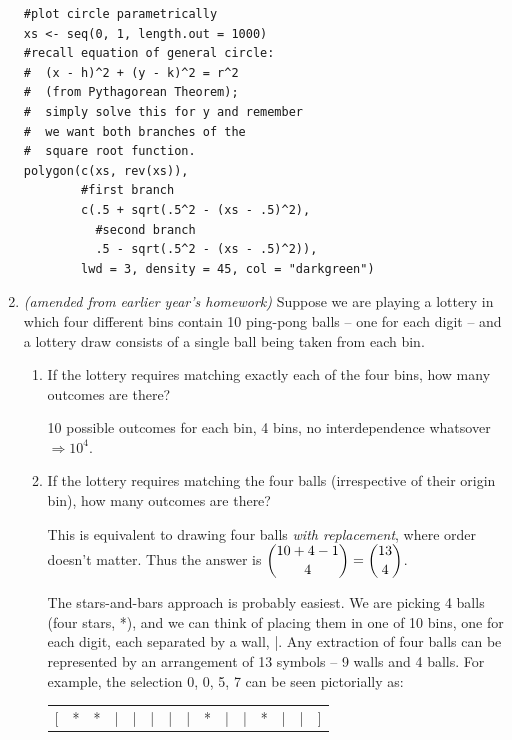 \documentclass{article}
\newenvironment{solution}{\color{red}}{\color{black}}
\begin{document}
\begin{enumerate}
\begin{solution}
\begin{lstlisting}
#plot circle parametrically
xs <- seq(0, 1, length.out = 1000)
#recall equation of general circle:
#  (x - h)^2 + (y - k)^2 = r^2
#  (from Pythagorean Theorem);
#  simply solve this for y and remember
#  we want both branches of the 
#  square root function.
polygon(c(xs, rev(xs)),
        #first branch
        c(.5 + sqrt(.5^2 - (xs - .5)^2),
          #second branch
          .5 - sqrt(.5^2 - (xs - .5)^2)),
        lwd = 3, density = 45, col = "darkgreen")
\end{lstlisting}

\end{solution}

\item \textit{(amended from earlier year's homework)} Suppose we are playing a lottery in which four different bins contain 10 ping-pong balls -- one for each digit -- and a lottery draw consists of a single ball being taken from each bin.
\begin{enumerate}
\item If the lottery requires matching exactly each of the four bins, how many outcomes are there?

\begin{solution}
10 possible outcomes for each bin, 4 bins, no interdependence whatsover $\Rightarrow 10^4$.
\end{solution}

\item If the lottery requires matching the four balls (irrespective of their origin bin), how many outcomes are there?

\begin{solution}
This is equivalent to drawing four balls \textit{with replacement}, where order doesn't matter. Thus the answer is $\dbinom{10 + 4 - 1}{4} = \dbinom{13}4$.

The stars-and-bars approach is probably easiest. We are picking 4 balls (four stars, *), and we can think of placing them in one of 10 bins, one for each digit, each separated by a wall, |. Any extraction of four balls can be represented by an arrangement of 13 symbols -- 9 walls and 4 balls. For example, the selection 0, 0, 5, 7 can be seen pictorially as:

\begin{center}
\begin{tabular}{ccccccccccccccc}
[ & * & * & | & | & | & | & | & * & | & | & * & | & | & ]
\end{tabular}
\end{center}


\end{solution}
\end{enumerate}
\end{enumerate}
\end{document}
